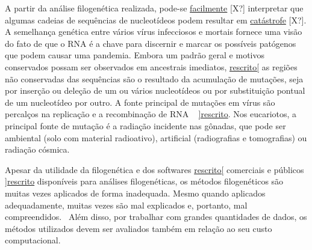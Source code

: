 \documentclass[font=plain]{abnt}
\begin{document}
A partir da análise filogenética realizada, pode-se \underline{facilmente} [X?] interpretar que algumas cadeias de sequências de nucleotídeos podem resultar em \underline{catástrofe} [X?]. A semelhança genética entre vários vírus infecciosos e mortais fornece uma visão do fato de que o RNA é a chave para discernir e marcar os possíveis patógenos que podem causar uma pandemia. Embora um padrão geral e motivos conservados possam ser observados em ancestrais imediatos, \underline{rescrito[} as regiões não conservadas das sequências são o resultado da acumulação de mutações, seja por inserção ou deleção de um ou vários nucleotídeos ou por substituição pontual de um nucleotídeo por outro. A fonte principal de mutações em vírus são percalços na replicação e a recombinação de RNA ~\cite[p. 11]{behl_threat_2022} \underline{]rescrito}. Nos eucariotos, a principal fonte de mutação é a radiação incidente nas gônadas, que pode ser ambiental (solo com material radioativo), artificial (radiografias e tomografias) ou radiação cósmica.

Apesar da utilidade da filogenética e dos softwares \underline{rescrito[} comerciais e públicos \underline{]rescrito} disponíveis para análises filogenéticas, os métodos filogenéticos são muitas vezes aplicados de forma inadequada. Mesmo quando aplicados adequadamente, muitas vezes são mal explicados e, portanto, mal compreendidos.~\cite[p. 1]{barry_phylogenetic_analysis_2006} Além disso, por trabalhar com grandes quantidades de dados, os métodos utilizados devem ser avaliados também em relação ao seu custo computacional.



\end{document}
